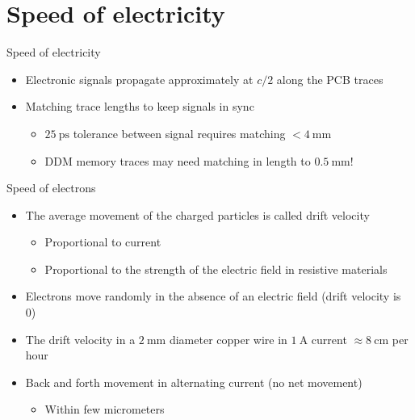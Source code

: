 \documentclass{beamer}
\begin{document}
\section{Speed of electricity}

\begin{frame}{Speed of electricity}
\begin{itemize}
 \item Electronic signals propagate approximately at $c/2$ along the PCB traces~\cite[p. 8--9]{horowitz2020art}
 \item Matching trace lengths to keep signals in sync
 \begin{itemize}
  \item $\SI{25}{\pico\second}$ tolerance between signal requires matching $<\SI{4}{\milli\meter}$
  \item DDM memory traces may need matching in length to $\SI{0.5}{\milli\meter}$!\\
 \end{itemize}
\end{itemize}
\end{frame}

\begin{frame}{Speed of electrons}
\begin{itemize}
 \item The average movement of the charged particles is called drift velocity
 \begin{itemize}
  \item Proportional to current
  \item Proportional to the strength of the electric field in resistive materials
 \end{itemize}
 \item Electrons move randomly in the absence of an electric field (drift velocity is 0)
 \item The drift velocity in a $\SI{2}{\milli\meter}$ diameter copper wire in
       $\SI{1}{\ampere}$ current $\approx\SI{8}{\centi\meter}$ per hour~\cite{wiki:Speed_of_electricity}
 \item Back and forth movement in alternating current (no net movement)
 \begin{itemize}
  \item Within few micrometers
 \end{itemize}
\end{itemize}

\end{frame}
\end{document}
